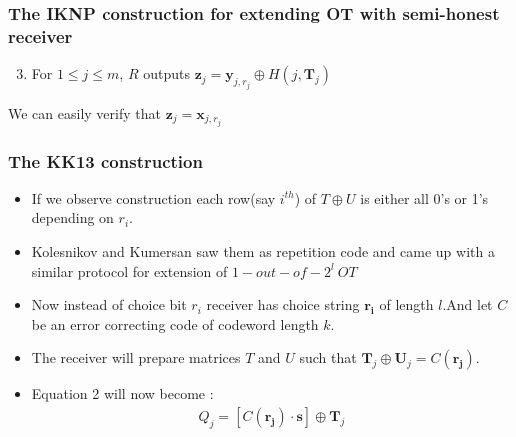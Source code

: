 \documentclass[hyperref={pdfpagelabels=false}]{beamer}
\theoremstyle{remark}
\begin{document}
\begin{frame}
\frametitle{The IKNP construction for extending OT with semi-honest receiver}

\begin{enumerate}
\setcounter{enumi}{2}
\item For $1 \leq j \leq m$, $R$ outputs $\mathbf{z}_{j} = \mathbf{y}_{j,r_j} \oplus H(j, \mathbf{T}_{j})$\pause
\end{enumerate}
We can easily verify that $\mathbf{z}_{j} =\mathbf{x}_{j,r_j}$
\end{frame}


\begin{frame}
\frametitle{The KK13 construction}
\begin{itemize}
\item If we observe \cite{IKNP} construction each row(say $i^{th}$) of $T \oplus U$ is either all 0's or 1's depending on $r_i$. \pause
\item Kolesnikov and Kumersan saw them as repetition code and came up with a similar protocol for extension of $1-out-of-2^l\ OT$ \pause
\item Now instead of choice bit $r_i$ receiver has choice string $\mathbf{r_i}$ of length $l$.\pause And let $C$ be an error correcting code of codeword length $k$. \pause
\item The receiver will prepare matrices $T$ and $U$ such that $\mathbf{T}_j \oplus \mathbf{U}_j = C(\mathbf{r_j})$.
\item Equation 2 will now become :
\begin{align}
Q_j = [ C(\mathbf{r_j}) \cdot \mathbf{s} ] \oplus \mathbf{T}_j
\end{align}

\end{itemize}
\end{frame}
\end{document}
